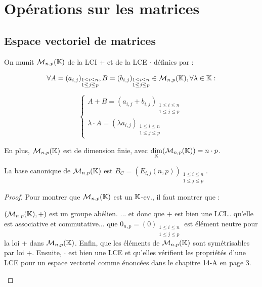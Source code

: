 \documentclass[12pt, a4paper]{report}
\begin{document}
\chapter{Opérations sur les matrices}

\section{Espace vectoriel de matrices}

\begin{definition}
    On munit $\mathcal M_{n,p}(\mathbb{K})$ de la LCI + et de la LCE $\cdot$ définies par :
    
    $$\forall A = (a_{i,j})_{\substack{1 \le i \le n \\ 1 \le j \le p}}, B = (b_{i,j})_{\substack{1 \le i \le n \\ 1 \le j \le p}} \in \mathcal M_{n,p}(\mathbb{K}), \forall \lambda \in \mathbb{K} :$$

    $$\begin{cases}
    A + B = (a_{i,j} + b_{i,j})_{\substack{1 \le i \le n \\ 1 \le j \le p}}\\ \lambda \cdot  A = (\lambda a_{i,j})_{\substack{1 \le i \le n \\ 1 \le j \le p}}
    \end{cases}$$

    En plus, $\mathcal M_{n,p}(\mathbb{K})$ est de dimension finie, avec $\underset{\mathbb{K}}\dim(\mathcal M_{n,p}(\mathbb{K})) = n\cdot p$.

    La base canonique de $\mathcal M_{n,p}(\mathbb{K})$ est $B_C = (E_{i,j}(n,p))_{\substack{1 \le i \le n\\ 1 \le j \le p}}$.
\end{definition}

\begin{proof}
    Pour montrer que $\mathcal M_{n,p}(\mathbb{K})$ est un $\mathbb{K}$-ev., il faut montrer que :
    \begin{outline}
        \1 $(\mathcal M_{n,p}(\mathbb{K}),+)$ est un groupe abélien.
        \2 ... et donc que $+$ est bien une LCI\dots
        \2 qu'elle est associative et commutative...
        \2 que $0_{n,p} = (0)_{\substack{1 \le i \le n \\ 1 \le j \le p}}$ est élément neutre pour la loi + dans $\mathcal M_{n,p}(\mathbb{K})$.
        \2 Enfin, que les éléments de $\mathcal M_{n,p}(\mathbb{K})$ sont symétrisables par loi +.
        \1 Ensuite, $\cdot$ est bien une LCE et qu'elles vérifient les propriétés d'une LCE pour un espace vectoriel comme énoncées dans le chapitre 14-A en page 3.
    \end{outline}
\end{proof}
\end{document}
